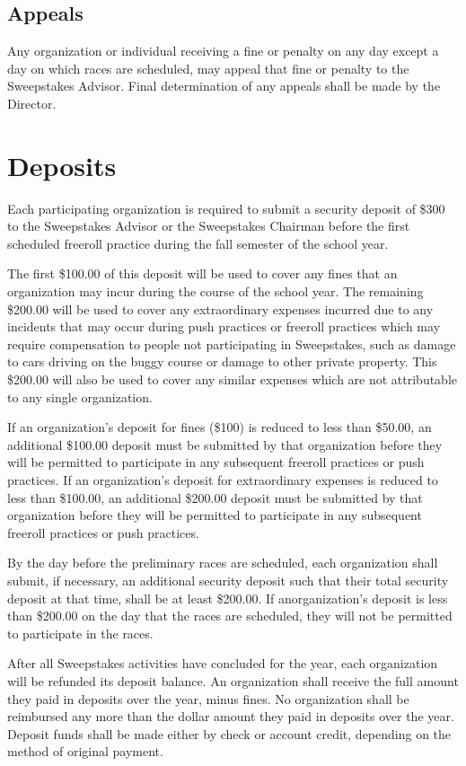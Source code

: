 \subsection{Appeals}

	Any organization or individual receiving a fine or penalty on any day except a
	day on which races are scheduled, may appeal that fine or penalty to the
	Sweepstakes Advisor. Final determination of any appeals shall be made by the
	Director.

\section{Deposits}

	Each participating organization is required to submit a security deposit of
	\$300 to the Sweepstakes Advisor or the Sweepstakes Chairman before the first
	scheduled freeroll practice during the fall semester of the school year.

	The first \$100.00 of this deposit will be used to cover any fines that an
	organization may incur during the course of the school year. The remaining
	\$200.00 will be used to cover any extraordinary expenses incurred due to any
	incidents that may occur during push practices or freeroll practices which may
	require compensation to people not participating in Sweepstakes, such as damage
	to cars driving on the buggy course or damage to other private property. This
	\$200.00 will also be used to cover any similar expenses which are not
	attributable to any single organization.

	If an organization's deposit for fines (\$100) is reduced to less than \$50.00,
	an additional \$100.00 deposit must be submitted by that organization before
	they will be permitted to participate in any subsequent freeroll practices or
	push practices. If an organization's deposit for extraordinary expenses is
	reduced to less than \$100.00, an additional \$200.00 deposit must be submitted
	by that organization before they will be permitted to participate in any
	subsequent freeroll practices or push practices.

	By the day before the preliminary races are scheduled, each organization shall
	submit, if necessary, an additional security deposit such that their total
	security deposit at that time, shall be at least \$200.00. If anorganization's
	deposit is less than \$200.00 on the day that the races are scheduled, they
	will not be permitted to participate in the races.

	After all Sweepstakes activities have concluded for the year, each organization
	will be refunded its deposit balance. An organization shall receive the full
	amount they paid in deposits over the year, minus fines. No organization shall
	be reimbursed any more than the dollar amount they paid in deposits over the
	year. Deposit funds shall be made either by check or account credit, depending
	on the method of original payment.

